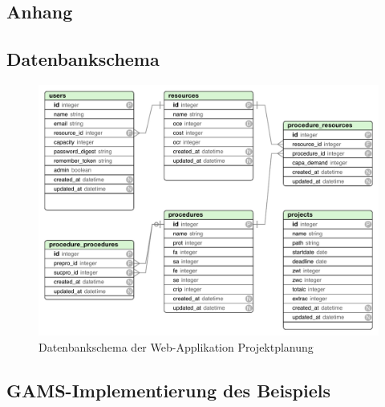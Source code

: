 \documentclass[a4paper,12pt,parskip,bibtotoc,liststotoc]{article}
\begin{document}
\newpage

\newpage
%
%
\begin{appendix}
\section{Anhang}

\subsection{Datenbankschema}\label{db-schema}

\begin{figure}[h!]
  \begin{center}
    \includegraphics[width=150mm]{Bilder/DB.pdf}
    \caption{Datenbankschema der Web-Applikation Projektplanung}  \label{schema}
  \end{center}
\end{figure}

\subsection{GAMS-Implementierung des Beispiels}\label{Imp}
%



\end{appendix}
\end{document}
